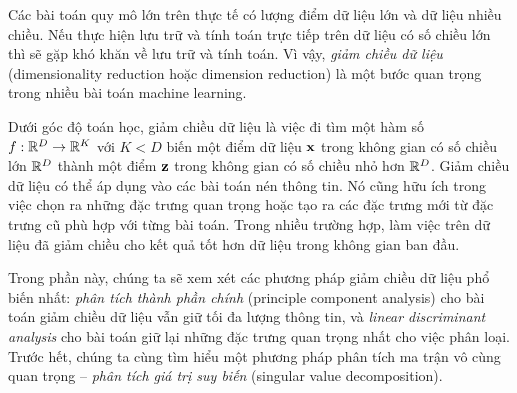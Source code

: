 Các bài toán quy mô lớn trên thực tế có lượng điểm dữ liệu lớn và dữ liệu nhiều
chiều. Nếu thực hiện lưu trữ và tính toán trực tiếp trên dữ liệu có số chiều lớn
thì sẽ gặp khó khăn về lưu trữ và tính toán. Vì vậy, \textit{giảm
chiều dữ liệu} ({dimensionality reduction} hoặc {dimension reduction}) là một
bước quan trọng trong nhiều bài toán machine learning.


Dưới góc độ toán học, giảm chiều dữ liệu là việc đi tìm một hàm số $f: \mathbb{R}^D
\rightarrow \mathbb{R}^K$ với $K < D$ biến một điểm dữ liệu $\mathbf{x}$ trong không gian có số
chiều lớn $\mathbb{R}^D$ thành một điểm $\mathbf{z}$ trong không gian có số chiều nhỏ hơn
$\mathbb{R}^D$. Giảm chiều dữ liệu có thể áp dụng vào các bài toán nén thông tin. Nó cũng hữu ích trong việc chọn ra những đặc trưng quan trọng hoặc
tạo ra các đặc trưng mới từ đặc trưng cũ phù hợp với từng bài toán. Trong nhiều trường hợp, làm việc trên dữ liệu đã giảm chiều cho kết quả tốt
hơn dữ liệu trong không gian ban đầu.

Trong phần này, chúng ta sẽ xem xét các phương pháp giảm chiều dữ liệu phổ biến
nhất: \textit{phân tích thành phần chính} ({principle component analysis}) cho bài toán giảm chiều dữ liệu
vẫn giữ tối đa lượng thông tin, và \textit{linear discriminant analysis}
cho bài toán giữ lại những đặc trưng quan trọng nhất cho việc phân loại. Trước
hết, chúng ta cùng tìm hiểu một phương pháp phân tích ma trận vô
cùng quan trọng  --  \textit{phân tích giá trị suy biến} ({singular value decomposition}).
